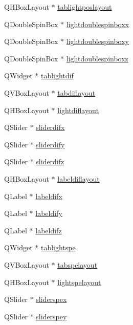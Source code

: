 \begin{DoxyCompactItemize}
Q\+H\+Box\+Layout $\ast$ \hyperlink{class_mondock_aa1e272ef1c0db51aac8861812e367b27}{tablightposlayout}
\item 
Q\+Double\+Spin\+Box $\ast$ \hyperlink{class_mondock_a16569a61106b1c9d6506d1d2a2600759}{lightdoublespinboxx}
\item 
Q\+Double\+Spin\+Box $\ast$ \hyperlink{class_mondock_a5829d9ba58222d9ec1905d9b81efeea2}{lightdoublespinboxy}
\item 
Q\+Double\+Spin\+Box $\ast$ \hyperlink{class_mondock_a7f9c9c2b765d28670aac280b38773ee9}{lightdoublespinboxz}
\item 
Q\+Widget $\ast$ \hyperlink{class_mondock_a7e42b87b7c1088da35395d5f1ef690d8}{tablightdif}
\item 
Q\+V\+Box\+Layout $\ast$ \hyperlink{class_mondock_a2691df29ebeefa273d759a15eb4c9f51}{tabdiflayout}
\item 
Q\+H\+Box\+Layout $\ast$ \hyperlink{class_mondock_a82bd5ea86bfd95368bdef210a807b1c4}{lightdiflayout}
\item 
Q\+Slider $\ast$ \hyperlink{class_mondock_a1d4f04858d8142be0a35b1aad9f14345}{sliderdifx}
\item 
Q\+Slider $\ast$ \hyperlink{class_mondock_a61a2ab20f30425efa13abc19241dfcb7}{sliderdify}
\item 
Q\+Slider $\ast$ \hyperlink{class_mondock_af68d00a8f6995732dc8f5861b1b64de2}{sliderdifz}
\item 
Q\+H\+Box\+Layout $\ast$ \hyperlink{class_mondock_a2cc5ecc094ac129ac7cf6c70147b8d29}{labeldiflayout}
\item 
Q\+Label $\ast$ \hyperlink{class_mondock_adc2193f6756de65b0d3a3f5a3a0e7164}{labeldifx}
\item 
Q\+Label $\ast$ \hyperlink{class_mondock_ab869df2ebba1417ef476ae6df23084f3}{labeldify}
\item 
Q\+Label $\ast$ \hyperlink{class_mondock_ac4418e6866dac5b4917ed73f43ccbcaa}{labeldifz}
\item 
Q\+Widget $\ast$ \hyperlink{class_mondock_a99dad8f1fa710a564d0e8348e992372e}{tablightspe}
\item 
Q\+V\+Box\+Layout $\ast$ \hyperlink{class_mondock_af59762fb339ae8c0821fada75433e8fb}{tabspelayout}
\item 
Q\+H\+Box\+Layout $\ast$ \hyperlink{class_mondock_a9d565bf7d99d0dc112fedc26f21abf2d}{lightspelayout}
\item 
Q\+Slider $\ast$ \hyperlink{class_mondock_abd032f6caee1a61430b8f37fdf872c55}{sliderspex}
\item 
Q\+Slider $\ast$ \hyperlink{class_mondock_ab99848143e6941f878cb9328681d7690}{sliderspey}

\end{DoxyCompactItemize}
